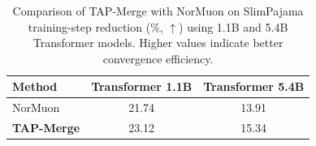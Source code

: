 \begin{table}[t]
\centering\small
\caption{Comparison of TAP-Merge with NorMuon
on SlimPajama training-step reduction
($\%$, $\uparrow$) using 1.1B and 5.4B
Transformer models. Higher values
indicate better convergence efficiency.}
\label{tab:slim_steps}
\begin{tabular}{lcc}
\toprule
Method & Transformer 1.1B & Transformer 5.4B\\
\midrule
NorMuon~\cite{normuon2026} & 21.74 & 13.91\\
\midrule
\textbf{TAP-Merge} & 23.12 & 15.34\\ \bottomrule
\end{tabular}
\end{table}
